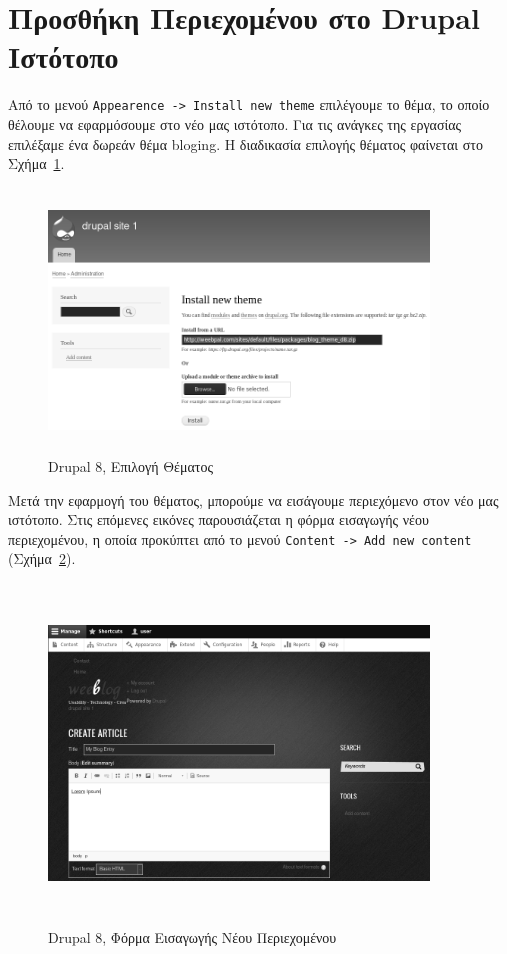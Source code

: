 \documentclass[12pt]{report}
\begin{document}
\section{Προσθήκη Περιεχομένου στο \textlatin{Drupal} Ιστότοπο}
Από το μενού \textlatin{\texttt{Appearence -> Install new theme}} επιλέγουμε το θέμα, το οποίο θέλουμε να εφαρμόσουμε στο νέο μας ιστότοπο. Για τις ανάγκες της εργασίας επιλέξαμε ένα δωρεάν θέμα \textlatin{bloging}. Η διαδικασία επιλογής θέματος φαίνεται στο Σχήμα~\ref{fig:drupal_theme}.
\begin{figure}[H]
\centering
\includegraphics[width=0.9\textwidth, height=7cm]{drupal-add-theme-gray}
\caption{\textlatin{Drupal 8}, Επιλογή Θέματος}
\label{fig:drupal_theme}
\end{figure}

Μετά την εφαρμογή του θέματος, μπορούμε να εισάγουμε περιεχόμενο στον νέο μας ιστότοπο. Στις επόμενες εικόνες παρουσιάζεται η φόρμα εισαγωγής νέου περιεχομένου, η οποία προκύπτει από το μενού \textlatin{\texttt{Content -> Add new content}} (Σχήμα~\ref{fig:drupal_add_content}).
\begin{figure}[H]
\centering
\includegraphics[width=0.9\textwidth, height=9cm]{drupal-add-content-gray}
\caption{\textlatin{Drupal 8}, Φόρμα Εισαγωγής Νέου Περιεχομένου}
\label{fig:drupal_add_content}
\end{figure}
\end{document}
